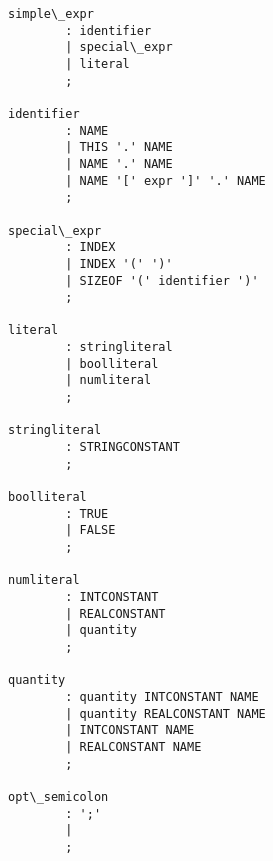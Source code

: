 \begin{Verbatim}[commandchars=\\\{\}]
simple\_expr
        : identifier
        | special\_expr
        | literal
        ;

identifier
        : NAME
        | THIS '.' NAME
        | NAME '.' NAME
        | NAME '[' expr ']' '.' NAME
        ;

special\_expr
        : INDEX
        | INDEX '(' ')'
        | SIZEOF '(' identifier ')'
        ;

literal
        : stringliteral
        | boolliteral
        | numliteral
        ;

stringliteral
        : STRINGCONSTANT
        ;

boolliteral
        : TRUE
        | FALSE
        ;

numliteral
        : INTCONSTANT
        | REALCONSTANT
        | quantity
        ;

quantity
        : quantity INTCONSTANT NAME
        | quantity REALCONSTANT NAME
        | INTCONSTANT NAME
        | REALCONSTANT NAME
        ;

opt\_semicolon
        : ';'
        |
        ;
\end{Verbatim}


